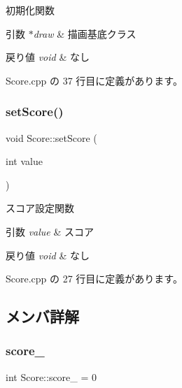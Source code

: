 初期化関数 


\begin{DoxyParams}{引数}
{\em $\ast$draw} & 描画基底クラス \\
\hline
\end{DoxyParams}

\begin{DoxyRetVals}{戻り値}
{\em void} & なし \\
\hline
\end{DoxyRetVals}


 Score.\+cpp の 37 行目に定義があります。

\mbox{\label{class_score_a11cc65a5d91bb14d62a364150565972d}} 
\subsubsection{\texorpdfstring{set\+Score()}{setScore()}}
{\footnotesize\ttfamily void Score\+::set\+Score (\begin{DoxyParamCaption}\item[{int}]{value }\end{DoxyParamCaption})}



スコア設定関数 


\begin{DoxyParams}{引数}
{\em value} & スコア \\
\hline
\end{DoxyParams}

\begin{DoxyRetVals}{戻り値}
{\em void} & なし \\
\hline
\end{DoxyRetVals}


 Score.\+cpp の 27 行目に定義があります。



\subsection{メンバ詳解}
\mbox{\label{class_score_acaeda7737ddfbd4401adf960d3975d74}} 
\subsubsection{\texorpdfstring{score\+\_\+}{score\_}}
{\footnotesize\ttfamily int Score\+::score\+\_\+ = 0\hspace{0.3cm}{\ttfamily [private]}}



